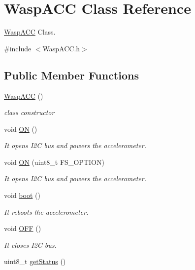 \hypertarget{class_wasp_a_c_c}{}\section{Wasp\+A\+CC Class Reference}
\label{class_wasp_a_c_c}


\hyperlink{class_wasp_a_c_c}{Wasp\+A\+CC} Class.  




{\ttfamily \#include $<$Wasp\+A\+C\+C.\+h$>$}

\subsection*{Public Member Functions}
\begin{DoxyCompactItemize}
\item 
\hyperlink{class_wasp_a_c_c_a843d6783152d28a13ced1a09caaba27d}{Wasp\+A\+CC} ()
\begin{DoxyCompactList}\small\item\em class constructor \end{DoxyCompactList}\item 
void \hyperlink{class_wasp_a_c_c_a69aeeb4b8a9a5fc189d77c3764984a17}{ON} ()
\begin{DoxyCompactList}\small\item\em It opens I2C bus and powers the accelerometer. \end{DoxyCompactList}\item 
void \hyperlink{class_wasp_a_c_c_acd8e202fd80a7a7c95df36fbf5ecf7c1}{ON} (uint8\+\_\+t F\+S\+\_\+\+O\+P\+T\+I\+ON)
\begin{DoxyCompactList}\small\item\em It opens I2C bus and powers the accelerometer. \end{DoxyCompactList}\item 
void \hyperlink{class_wasp_a_c_c_a55ea9e65192a9940d5773c164fa0bcab}{boot} ()
\begin{DoxyCompactList}\small\item\em It reboots the accelerometer. \end{DoxyCompactList}\item 
void \hyperlink{class_wasp_a_c_c_aabd457aa421b8f323b724184aa1b66fa}{O\+FF} ()
\begin{DoxyCompactList}\small\item\em It closes I2C bus. \end{DoxyCompactList}\item 
uint8\+\_\+t \hyperlink{class_wasp_a_c_c_a65e4b85a09b10b32ec7580a55e78723b}{get\+Status} ()

\end{DoxyCompactItemize}
